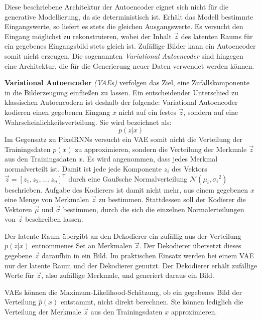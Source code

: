 Diese beschriebene Architektur der Autoencoder eignet sich nicht für die generative Modellierung, da sie deterministisch ist. Erhält das Modell bestimmte Eingangswerte, so liefert es stets die gleichen Ausgangswerte. Es versucht den Eingang möglichst zu rekonstruieren, wobei der Inhalt $\vec{z}$ des latenten Raums für ein gegebenes Eingangsbild stets gleich ist. Zufällige Bilder kann ein Autoencoder somit nicht erzeugen. Die sogenannten \emph{Variational Autoencoder} sind hingegen eine Architektur, die für die Generierung neuer Daten verwendet werden können. \cite{visualApproach} \cite{generativeModelsSurvey}

\textbf{Variational Autoencoder} \emph{(\acsp{VAE})} verfolgen das Ziel, eine Zufallskomponente in die Bilderzeugung einfließen zu lassen. Ein entscheidender Unterschied zu klassischen Autoencodern ist deshalb der folgende: Variational Autoencoder kodieren einen gegebenen Eingang $x$ nicht auf ein festes $\vec{z}$, sondern auf eine Wahrscheinlichkeitsverteilung. Sie wird bezeichnet als: \cite{autoencoders}
\begin{equation}
   p(z|x)
\end{equation}
Im Gegensatz zu \acp{PixelRNN} versucht ein \acs{VAE} somit nicht die Verteilung der Trainingsdaten $p(x)$ zu approximieren, sondern die Verteilung der Merkmale $\vec{z}$ aus den Trainingsdaten $x$.
Es wird angenommen, dass jedes Merkmal normalverteilt ist. Damit ist jede jede Komponente $z_{i}$ des Vektors $\vec{z} = [z_{1}, z_{2}, ..., z_{n}]^\mathsf{T}$ durch eine Gaußsche Normalverteilung $\mathcal{N}(\mu_{i}, {\sigma_{i}}^{2})$ beschrieben. Aufgabe des Kodierers ist damit nicht mehr, aus einem gegebenen $x$ eine Menge von Merkmalen $\vec{z}$ zu bestimmen. Stattdessen soll der Kodierer die Vektoren $\vec{\mu}$ und $\vec{\sigma}$ bestimmen, durch die sich die einzelnen Normalerteilungen von $\vec{z}$ beschreiben lassen. \cite{generativeModelsSurvey} \cite{autoencoders}

Der latente Raum übergibt an den Dekodierer ein zufällig aus der Verteilung $p(z|x)$ entnommenes Set an Merkmalen $\vec{z}$.
Der Dekodierer übersetzt dieses gegebene $\vec{z}$ daraufhin in ein Bild. Im praktischen Einsatz werden bei einem \acs{VAE} nur der latente Raum und der Dekodierer genutzt. Der Dekodierer erhält zufällige Werte für $\vec{z}$, also zufällige Merkmale, und generiert daraus ein Bild. \cite{autoencoders} \cite{visualApproach}

\acp{VAE} können die Maximum-Likelihood-Schätzung, ob ein gegebenes Bild der Verteilung $\hat{p}(x)$ entstammt, nicht direkt berechnen. Sie können lediglich die Verteilung der Merkmale $\vec{z}$ aus den Trainingsdaten $x$ approximieren.

